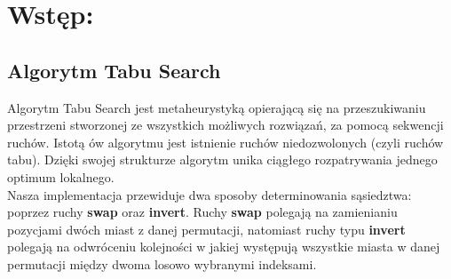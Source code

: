 \section{Wstęp: }
\subsection{Algorytm Tabu Search}
  Algorytm Tabu Search jest metaheurystyką opierającą się na przeszukiwaniu przestrzeni
  stworzonej ze wszystkich możliwych rozwiązań, za pomocą sekwencji ruchów. Istotą ów algorytmu 
  jest istnienie ruchów niedozwolonych (czyli ruchów tabu). Dzięki swojej strukturze algorytm
  unika ciągłego rozpatrywania jednego optimum lokalnego. \\
  Nasza implementacja przewiduje dwa sposoby determinowania sąsiedztwa: poprzez ruchy
  \textbf{swap} oraz \textbf{invert}. Ruchy \textbf{swap} polegają na zamienianiu pozycjami
  dwóch miast z danej permutacji, natomiast ruchy typu \textbf{invert} polegają na odwróceniu kolejności
  w jakiej występują wszystkie miasta w danej permutacji między dwoma losowo wybranymi indeksami.\\

